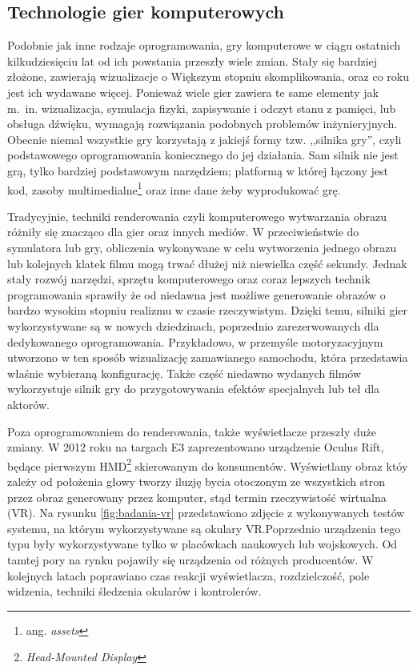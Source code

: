 \subsection{Technologie gier komputerowych}
Podobnie jak inne rodzaje oprogramowania, gry komputerowe w ciągu ostatnich kilkudziesięciu lat od ich powstania przeszły wiele zmian. Stały się bardziej złożone, zawierają wizualizacje o Większym stopniu skomplikowania, oraz co roku jest ich wydawane więcej. Ponieważ wiele gier zawiera te same elementy jak m.~in. wizualizacja, symulacja fizyki, zapisywanie i odczyt stanu z pamięci, lub obsługa dźwięku, wymagają rozwiązania podobnych problemów inżynieryjnych. Obecnie niemal wszystkie gry korzystają z jakiejś formy tzw. ,,silnika gry'', czyli podstawowego oprogramowania koniecznego do jej działania. Sam silnik nie jest grą, tylko bardziej podstawowym narzędziem; platformą w której łączony jest kod, zasoby multimedialne\footnote{ang. \emph{assets}} oraz inne dane żeby wyprodukować grę\cite{toftedahl2019}.

Tradycyjnie, techniki renderowania czyli komputerowego wytwarzania obrazu różniły się znacząco dla gier oraz innych mediów. W przeciwieństwie do symulatora lub gry, obliczenia wykonywane w celu wytworzenia jednego obrazu lub kolejnych klatek filmu mogą trwać dłużej niż niewielka część sekundy. Jednak stały rozwój narzędzi, sprzętu komputerowego oraz coraz lepszych technik programowania sprawiły że od niedawna jest możliwe generowanie obrazów o bardzo wysokim stopniu realizmu w czasie rzeczywistym. Dzięki temu, silniki gier wykorzystywane są w nowych dziedzinach, poprzednio zarezerwowanych dla dedykowanego oprogramowania. Przykładowo, w przemyśle motoryzacyjnym utworzono w ten sposób wizualizację zamawianego samochodu, która przedstawia właśnie wybieraną konfigurację\cite{audi2021}. Także część niedawno wydanych filmów wykorzystuje silnik gry do przygotowywania efektów specjalnych lub teł dla aktorów\cite{nfs2020}.

Poza oprogramowaniem do renderowania, także wyświetlacze przeszły duże zmiany. W 2012 roku na targach E3 zaprezentowano urządzenie Oculus Rift, będące pierwszym HMD\footnote{\emph{Head-Mounted Display}} skierowanym do konsumentów\cite{rubin2014}. Wyświetlany obraz któy zależy od położenia głowy tworzy iluzję bycia otoczonym ze wszystkich stron przez obraz generowany przez komputer, stąd termin rzeczywistość wirtualna (VR). Na rysunku \ref{fig:badania-vr} przedstawiono zdjęcie z wykonywanych testów systemu, na którym wykorzystywane są okulary VR.Poprzednio urządzenia tego typu były wykorzystywane tylko w placówkach naukowych lub wojskowych. Od tamtej pory na rynku pojawiły się urządzenia od różnych producentów. W kolejnych latach poprawiano czas reakcji wyświetlacza, rozdzielczość, pole widzenia, techniki śledzenia okularów i kontrolerów.

